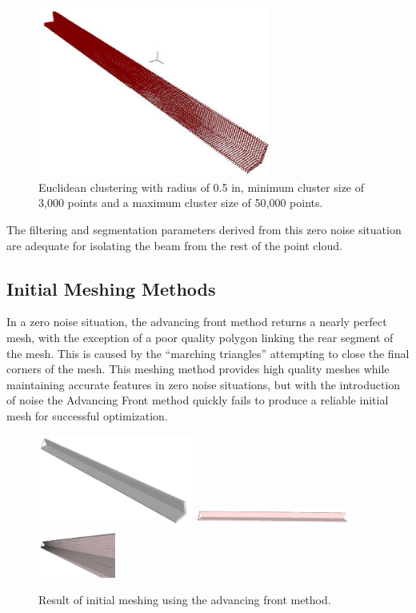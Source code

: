 \documentclass[12pt]{drexelthesis}
\let\Oldsubsection\subsection
\renewcommand{\subsection}{\FloatBarrier\Oldsubsection}
\begin{document}
\begin{figure}[!ht]
	\centering
		\includegraphics[width=3in]{simulated-lab-scan/0noise/euclidean-d05max50000min3000.jpg}
		\caption[Euclidean distance segmentation with ideal parameters.]{\centering  Euclidean clustering with radius of 0.5 in, minimum cluster size of 3,000 points and a maximum cluster size of 50,000 points.}
	\label{zeronoise:optimal}
\end{figure}

The filtering and segmentation parameters derived from this zero noise situation are adequate for isolating the beam from the rest of the point cloud.


\subsection{Initial Meshing Methods}
In a zero noise situation, the advancing front method returns a nearly perfect mesh, with the exception of a poor quality polygon linking the rear segment of the mesh. This is caused by the ``marching triangles'' attempting to close the final corners of the mesh. This meshing method provides high quality meshes while maintaining accurate features in zero noise situations, but with the introduction of noise the Advancing Front method quickly fails to produce a reliable initial mesh for successful optimization.

\begin{figure}[!ht]
	
	\centering
		\includegraphics[width=2in]{simulated-lab-scan/0noise/clean/advancingfront.png}
		\includegraphics[width=2in]{simulated-lab-scan/0noise/clean/advancingfront01.png}
		\includegraphics[width=1in]{simulated-lab-scan/0noise/clean/advancingfront02.png}
		\caption[Initial meshing using a raw advancing front approach]{\centering  Result of initial meshing using the advancing front method.}
		\label{zeronoise:advancingfront}
\end{figure}
\end{document}
